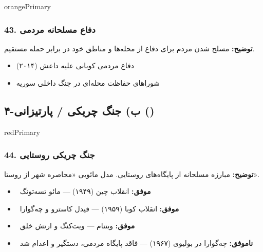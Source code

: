 \documentclass[a4paper,12pt]{article}
\newcommand{\success}[1]{\textcolor{greenPrimary}{\faCheckCircle\ \textbf{موفق:}} #1}
\newcommand{\failure}[1]{\textcolor{redPrimary}{\faTimesCircle\ \textbf{ناموفق:}} #1}
\newcommand{\methodnum}[1]{\textcolor{purpleLight}{\textbf{#1.}}}
\begin{document}
\begin{methodcard}{orangePrimary}
\subsubsection{\methodnum{43} دفاع مسلحانه مردمی}
\textbf{توضیح:} مسلح شدن مردم برای دفاع از محله‌ها و مناطق خود در برابر حمله مستقیم.

\begin{itemize}
  \item دفاع مردمی کوبانی علیه داعش (۲۰۱۴)
  \item شوراهای حفاظت محله‌ای در جنگ داخلی سوریه
\end{itemize}
\end{methodcard}


\subsection{\textcolor{redPrimary}{\faCircle[regular]} ۴-ب) جنگ چریکی / پارتیزانی ()}

\begin{methodcard}{redPrimary}
\subsubsection{\methodnum{44} جنگ چریکی روستایی}
\textbf{توضیح:} مبارزه مسلحانه از پایگاه‌های روستایی. مدل مائویی «محاصره شهر از روستا».

\begin{itemize}[label=\textcolor{greenPrimary}{\faCheckCircle}]
  \item \success{انقلاب چین (۱۹۴۹) — مائو تسه‌تونگ}
  \item \success{انقلاب کوبا (۱۹۵۹) — فیدل کاسترو و چه‌گوارا}
  \item \success{ویتنام — ویت‌کنگ و ارتش خلق}
\end{itemize}
\begin{itemize}[label=\textcolor{redPrimary}{\faTimesCircle}]
  \item \failure{چه‌گوارا در بولیوی (۱۹۶۷) — فاقد پایگاه مردمی، دستگیر و اعدام شد}
\end{itemize}
\end{methodcard}
\end{document}
